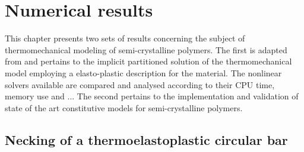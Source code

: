 \chapter{Numerical results} \label{sec:numerical_results}

This chapter presents two sets of results concerning the subject of thermomechanical modeling of semi-crystalline polymers.
The first is adapted from \cite{vila-chaNumericalAssessmentPartitioned2023a} and pertains to the implicit partitioned solution of the thermomechanical model employing a elasto-plastic description for the material.
The nonlinear solvers available are compared and analysed according to their CPU time, memory use and ...
The second pertains to the implementation and validation of state of the art constitutive models for semi-crystalline polymers.


\section{Necking of a thermoelastoplastic circular bar}
     \label{sec:mech-driv-probl}

